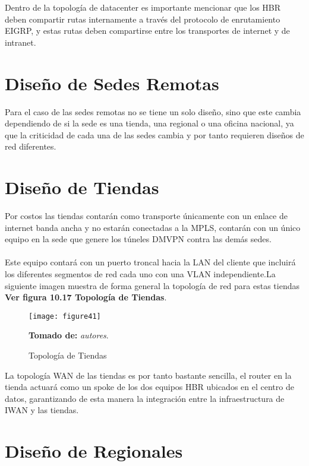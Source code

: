 Dentro de la topología de datacenter es importante mencionar que los HBR deben compartir rutas internamente a través del protocolo de enrutamiento EIGRP, y estas rutas deben compartirse entre los transportes de internet y de intranet.

\section{Diseño de Sedes Remotas}
\label{sec:Diseño de Sedes Remotas}

Para el caso de las sedes remotas no se tiene un solo diseño, sino que este cambia dependiendo de si la sede es una tienda, una regional o una oficina nacional, ya que la criticidad de cada una de las sedes cambia y por tanto requieren diseños de red diferentes.

\section{Diseño de Tiendas} %
\label{sec:Diseño de Tiendas}

Por costos las tiendas contarán como transporte únicamente con un enlace de internet banda ancha y no estarán conectadas a la MPLS, contarán con un único equipo en la sede que genere los túneles DMVPN contra las demás sedes.
\\
\\
Este equipo contará con un puerto troncal hacia la LAN del cliente que incluirá los diferentes segmentos de red cada uno con una VLAN independiente.La siguiente imagen muestra de forma general la topología de red para estas tiendas \textbf{Ver figura 10.17 Topología de Tiendas}.

\begin{figure}[htbp]
  \centering
    {\texttt{[image: figure41]}}%
  \caption{Topología de Tiendas}
   \textbf{Tomado de:} \textit{autores}.
  \label{fig:fig2subfig}
\end{figure}

La topología WAN de las tiendas es por tanto bastante sencilla, el router en la tienda actuará como un spoke de los dos equipos HBR ubicados en el centro de datos, garantizando de esta manera la integración entre la infraestructura de IWAN y las tiendas.

\section{Diseño de Regionales} %
\label{sec:Diseño de Regionales}

